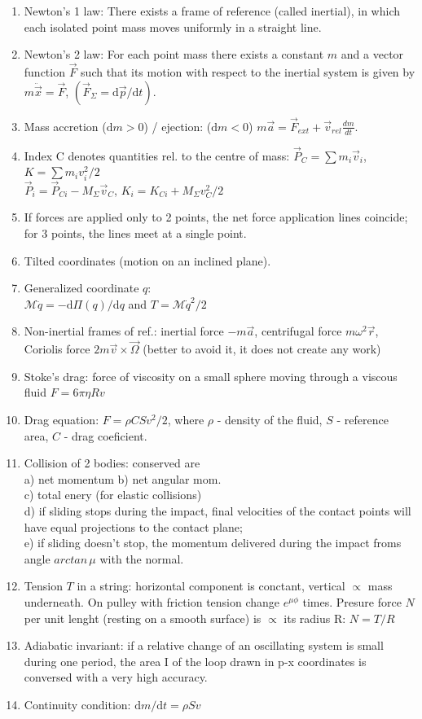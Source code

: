 \documentclass{article}
\renewcommand\d{\mathrm d}
\begin{document}
\begin{multicols}{3}
\begin{enumerate}
        \item Newton's 1 law: There exists a frame of reference (called inertial), in which each isolated point mass moves uniformly in a straight line.
        \item Newton's 2 law: For each point mass there exists a constant $m$ and a vector function $\vec F$ such that its motion with respect to the inertial system is given by $m\ddot{\vec{x}} =\vec F$, $\left(\vec F_\Sigma=\d\vec p/\d t\right)$.
        \item Mass accretion ($\d m>0$) / ejection: ($\d m<0$) $m\vec a=\vec F_{ext}+\vec v_{rel}\frac{dm}{dt}$.
        \item Index C denotes quantities rel. to the centre of mass:
            $\vec P_C=\sum m_i\vec v_i$, $K=\sum m_iv_i^2/2$\\ $\vec P_i=\vec P_{Ci}-M_\Sigma\vec v_C$, $K_i=K_{Ci}+M_\Sigma v_C^2/2$
        \item If forces are applied only to 2 points, the net force application lines coincide; for 3 points, the lines meet at a single point.
        \item Tilted coordinates (motion on an inclined plane).
        \item Generalized coordinate $q$:\\ $\mathcal M\ddot q =-\d\Pi(q)/\d q$ and $T =\mathcal M\dot{q}^2/2$
        \item Non-inertial frames of ref.: inertial force $-m\vec a$, centrifugal force $m\omega^2\vec r$, Coriolis force $2m\vec v\times\vec \Omega$ (better to avoid it, it does not create any work)
        \item Stoke's drag: force of viscosity on a small sphere moving through a viscous fluid $F=6\pi\eta Rv$
        \item Drag equation: $F=\rho CSv^2/2$, where $\rho$ - density of the fluid, $S$ - reference area, $C$ - drag coeficient.
        \item Collision of 2 bodies: conserved are\\
            a) net momentum b) net angular mom.\\
            c) total enery (for elastic collisions)\\
            d) if sliding stops during the impact, final velocities of the contact points will have equal projections to the contact plane;\\
            e) if sliding doesn't stop, the momentum delivered during the impact froms angle $arctan\,\mu$ with the normal.
        \item Tension $T$ in a string: horizontal component is conctant, vertical $\propto$ mass underneath. On pulley with friction tension change $e^{\mu\phi}$ times. Presure force $N$ per unit lenght (resting on a smooth surface) is $\propto$ its radius R: $N=T/R$
        \item Adiabatic invariant: if a relative change of an oscillating system is small during one period, the area I of the loop drawn in p-x coordinates is conversed with a very high accuracy.
        \item Continuity condition: $\d m/\d t=\rho Sv$


\end{enumerate}
\end{multicols}
\end{document}
